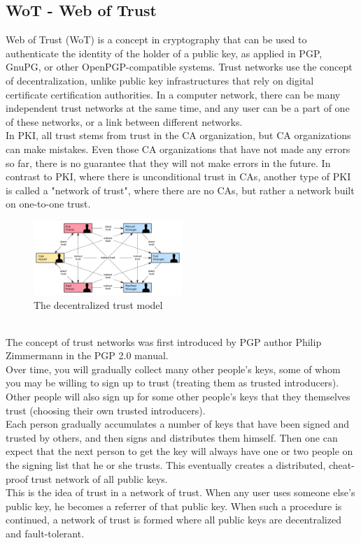 \subsection{WoT - Web of Trust}
Web of Trust (WoT)\cite{b7} is a concept in cryptography that can be used to authenticate the 
identity of the holder of a public key, as applied in PGP, GnuPG, or other OpenPGP-compatible 
systems\cite{b8, b9, b10}. Trust networks use the concept of decentralization, unlike public key 
infrastructures that rely on digital certificate certification authorities. In a 
computer network, there can be many independent trust networks at the same time, and 
any user can be a part of one of these networks, or a link between different networks\cite{b11}.
\\
In PKI, all trust stems from trust in the CA organization, but CA organizations can make 
mistakes. Even those CA organizations that have not made any errors so far, there is 
no guarantee that they will not make errors in the future. In contrast to PKI, where 
there is unconditional trust in CAs, another type of PKI is called a "network of trust", 
where there are no CAs, but rather a network built on one-to-one trust\cite{b7}.

\begin{figure}[H] %
    \centering %
    \includegraphics[width=0.5\textwidth]{figures/decentralized_trust_model.png} %
    \caption{The decentralized trust model} %
    \label{Fig.2: decentralized_trust_model} %
    \end{figure}
\\
The concept of trust networks was first introduced by PGP author Philip Zimmermann in 
the PGP 2.0 manual\cite{b7}.
\\
Over time, you will gradually collect many other people's keys, some of whom you may 
be willing to sign up to trust (treating them as trusted introducers). Other people 
will also sign up for some other people's keys that they themselves trust (choosing 
their own trusted introducers).
\\
Each person gradually accumulates a number of keys that have been signed and trusted 
by others, and then signs and distributes them himself. Then one can expect that the 
next person to get the key will always have one or two people on the signing list that 
he or she trusts. This eventually creates a distributed, cheat-proof trust network of 
all public keys.
\\
This is the idea of trust in a network of trust. When any user uses someone else's 
public key, he becomes a referrer of that public key. When such a procedure is 
continued, a network of trust is formed where all public keys are decentralized 
and fault-tolerant.

